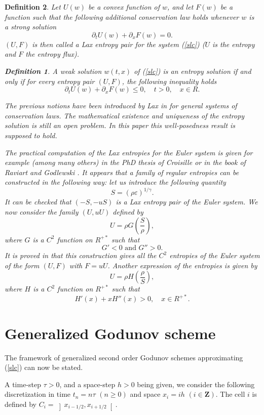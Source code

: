 \documentclass{fldauth}
\theoremstyle{plain}
\theoremstyle{plain}
\theoremstyle{plain}
\theoremstyle{plain}
\newtheorem{defn}{Definition}
\theoremstyle{plain}
\theoremstyle{plain}
\begin{document}
\begin{defn}
Let \( U(w) \) be a convex function of \( w \), and let \( F(w) \) be a function
such that the following additional conservation law holds whenever \( w \)
is a  strong solution
\[
\partial _{t}U(w)+\partial _{x}F(w)=0.\]
 \( (U,F) \) is then called a Lax entropy pair for the system (\ref{slc})
(\( U \) is the entropy and \( F \) the entropy flux).
\begin{defn}
A weak solution \( w(t,x) \) of (\ref{slc}) is an entropy solution if and
only if for every entropy pair \( (U,F) \), the following inequality holds
\[
\partial _{t}U(w)+\partial _{x}F(w)\leq 0,\quad t>0,\quad x\in R.\]

\end{defn}
The previous notions have been introduced by Lax in \cite{lax72} for general
systems of conservation laws. The mathematical existence and uniqueness of the
entropy solution is still an open problem. In this paper this well-posedness
result is supposed to hold.

The practical computation of the Lax entropies for the Euler system is given
for example (among many others) in the PhD thesis of Croisille \cite{croisille91}
or in the book of Raviart and Godlewski \cite{raviart96}. It appears that a
family of regular entropies can be constructed in the following way: let us
introduce the following quantity
\[
S=(\rho \varepsilon )^{1/\gamma }.\]
 It can be checked that \( (-S,-uS) \) is a Lax entropy pair of the Euler system.
We now consider the family \( (U,uU) \) defined by
\[
U=\rho G(\frac{S}{\rho }),\]
 where \( G \) is a \( C^{2} \) function on \( R^{+*} \) such that
\[
G'<0\textrm{ and }G''>0.\]
 It is proved in \cite{croisille91} that this construction gives all the \( C^{2} \)
entropies of the Euler system of the form \( (U,F) \) with \( F=uU \). Another
expression of the entropies is given by
\[
U=\rho H(\frac{\rho }{S}),\]
 where \( H \) is a \( C^{2} \) function on \( R^{+*} \) such that
\[
H'(x)+xH''(x)>0,\quad x\in R^{+*}.\]



\section{Generalized Godunov scheme}

\end{defn}
The framework of generalized second order Godunov schemes approximating (\ref{slc})
can now be stated.

A time-step \( \tau >0 \), and a space-step \( h>0 \) being given, we consider
the following discretization in time \( t_{n}=n\tau  \) \( (n\geq 0) \) and
space \( x_{i}=ih \) \( (i\in \mathbf{Z}) \). The cell \( i \) is defined
by \( C_{i}=\left] x_{i-1/2},x_{i+1/2}\right[  \).
\end{document}
